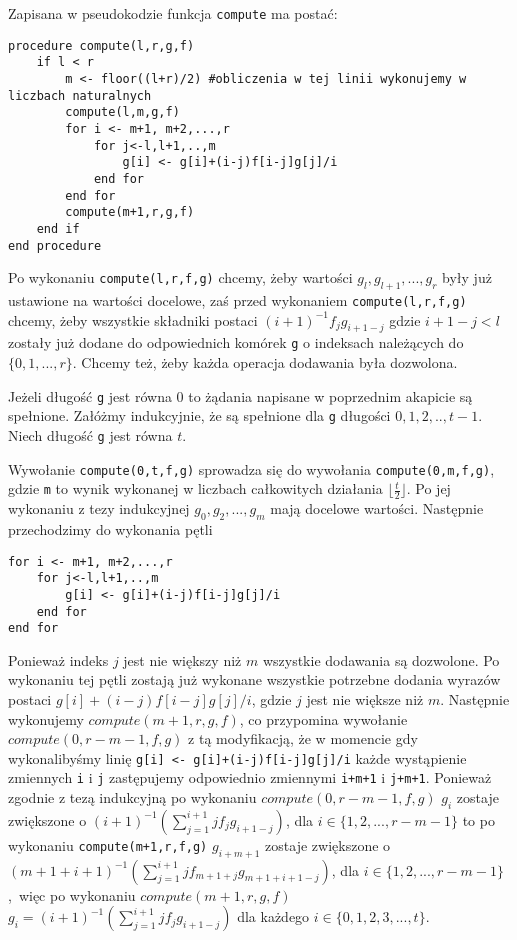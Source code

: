 \documentclass{article}
\begin{document}
Zapisana w pseudokodzie funkcja \texttt{compute} ma postać:

\begin{verbatim}
procedure compute(l,r,g,f)
    if l < r
        m <- floor((l+r)/2) #obliczenia w tej linii wykonujemy w liczbach naturalnych
        compute(l,m,g,f)
        for i <- m+1, m+2,...,r
            for j<-l,l+1,..,m
                g[i] <- g[i]+(i-j)f[i-j]g[j]/i
            end for
        end for
        compute(m+1,r,g,f)
    end if
end procedure
\end{verbatim}

Po wykonaniu \texttt{compute(l,r,f,g)} chcemy, żeby wartości $g_l,g_{l+1},...,g_{r}$ były już ustawione na wartości docelowe, zaś
przed wykonaniem \texttt{compute(l,r,f,g)} chcemy, żeby wszystkie składniki postaci $(i+1)^{-1}f_jg_{i+1-j}$ gdzie $i+1-j<l$ zostały
już dodane do odpowiednich komórek \texttt{g} o indeksach należących do $\{0,1,...,r\}$. Chcemy też, żeby każda operacja dodawania
była dozwolona. 

Jeżeli długość \texttt{g} jest równa $0$ to żądania napisane w poprzednim akapicie są spełnione. 
Załóżmy indukcyjnie, że są spełnione dla \texttt{g} długości $0,1,2,..,t-1$. Niech długość \texttt{g} jest równa $t$.

Wywołanie \texttt{compute(0,t,f,g)} sprowadza się do wywołania \texttt{compute(0,m,f,g)}, gdzie \texttt{m} to wynik wykonanej w
liczbach całkowitych działania $\lfloor \frac{t}{2}\rfloor$. Po jej wykonaniu z tezy indukcyjnej $g_0,g_2,...,g_m$ mają docelowe
wartości. Następnie przechodzimy do wykonania pętli
\begin{verbatim}
for i <- m+1, m+2,...,r
    for j<-l,l+1,..,m
        g[i] <- g[i]+(i-j)f[i-j]g[j]/i
    end for
end for
\end{verbatim}

Ponieważ indeks $j$ jest nie większy niż $m$ wszystkie dodawania są dozwolone. 
Po wykonaniu tej pętli zostają już wykonane wszystkie
potrzebne dodania wyrazów postaci $g[i]+(i-j)f[i-j]g[j]/i$, gdzie $j$ jest nie większe niż $m$. 
Następnie wykonujemy $compute(m+1,r,g,f)$, co przypomina wywołanie $compute(0,r-m-1,f,g)$ z tą modyfikacją, że w momencie 
gdy wykonalibyśmy linię \texttt{g[i] <- g[i]+(i-j)f[i-j]g[j]/i} każde wystąpienie
zmiennych \texttt{i} i \texttt{j} zastępujemy odpowiednio zmiennymi \texttt{i+m+1} i \texttt{j+m+1}. Ponieważ zgodnie z tezą
indukcyjną po wykonaniu \texttt{$compute(0,r-m-1,f,g)$}
$g_i$ zostaje zwiększone o $(i+1)^{-1}(\sum_{j=1}^{i+1}jf_jg_{i+1-j})$, dla $i \in \{1,2,...,r-m-1\}$ 
to po wykonaniu \texttt{compute(m+1,r,f,g)} $g_{i+m+1}$  zostaje zwiększone o $(m+1+i+1)^{-1}(\sum_{j=1}^{i+1}jf_{m+1+j}g_{m+1+i+1-j})$, 
dla $i \in \{1,2,...,r-m-1\}$, więc po wykonaniu $compute(m+1,r,g,f)$ $g_i=(i+1)^{-1}(\sum_{j=1}^{i+1}jf_jg_{i+1-j})$ dla każdego
$i \in \{0,1,2,3,...,t\}$. 
\end{document}
